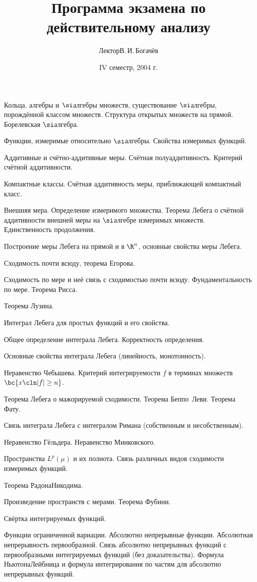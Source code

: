 \documentclass[a4paper]{article}
\title{Программа экзамена по действительному анализу}
\author{Лектор\т В.\,И.\,Богачёв}
\date{IV семестр, 2004 г.}
\begin{document}
\maketitle

\begin{nums}{-2}
\item Кольца, алгебры и $\si$\д алгебры множеств, существование $\si$\д алгебры,
      порождённой классом множеств. Структура открытых множеств на прямой.
      Борелевская $\si$\д алгебра.
\item Функции, измеримые относительно $\si$\д алгебры. Свойства измеримых функций.
\item Аддитивные и счётно-аддитивные меры. Счётная полуаддитивность. Критерий счётной аддитивности.
\item Компактные классы. Счётная аддитивность меры, приближающей компактный класс.
\item Внешняя мера. Определение измеримого множества. Теорема Лебега о
      счётной аддитивности внешней меры на $\si$\д алгебре измеримых
      множеств. Единственность продолжения.
\item Построение меры Лебега на прямой и в $\R^n$, основные свойства меры Лебега.
\item Сходимость почти всюду, теорема Егорова.
\item Сходимость по мере и неё связь с сходимостью почти всюду.
      Фундаментальность по мере. Теорема Рисса.
\item Теорема Лузина.
\item Интеграл Лебега для простых функций и его свойства.
\item Общее определение интеграла Лебега. Корректность определения.
\item Основные свойства интеграла Лебега (линейность, монотонность).
\item Неравенство Чебышева. Критерий интегрируемости $f$ в терминах множеств $\bc{x\cln |f| \ge n}$.
\item Теорема Лебега о мажорируемой сходимости. Теорема Беппо~Леви. Теорема Фату.
\item Связь интеграла Лебега с интегралом Римана (собственным и несобственным).
\item Неравенство Гёльдера. Неравенство Минковского.
\item Пространства $L^p(\mu)$ и их полнота. Связь различных видов сходимости измеримых функций.
\item Теорема Радона\ч Никодима.
\item Произведение пространств с мерами. Теорема Фубини.
\item Свёртка интегрируемых функций.
\item Функции ограниченной вариации. Абсолютно непрерывные функции.
      Абсолютная непрерывность первообразной. Связь абсолютно непрерывных
      функций с первообразными интегрируемых функций (без доказательства).
      Формула Ньютона\ч Лейбница и формула интегрирования по частям
      для абсолютно непрерывных функций.
\end{nums}

\medskip
\dmvntrail
\end{document}

